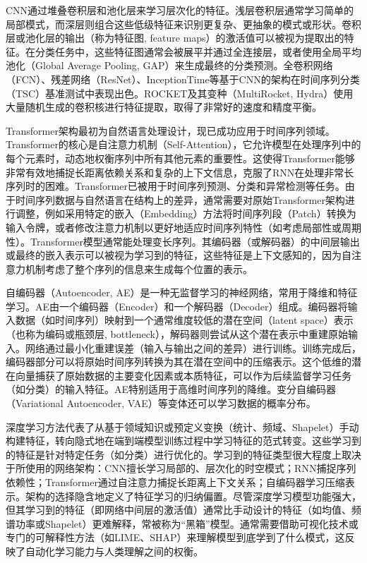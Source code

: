 CNN通过堆叠卷积层和池化层来学习层次化的特征。浅层卷积层通常学习简单的局部模式，而深层则组合这些低级特征来识别更复杂、更抽象的模式或形状。卷积层或池化层的输出（称为特征图, feature maps）的激活值可以被视为提取出的特征。在分类任务中，这些特征图通常会被展平并通过全连接层，或者使用全局平均池化（Global Average Pooling, GAP）来生成最终的分类预测。全卷积网络（FCN）、残差网络（ResNet）、InceptionTime等基于CNN的架构在时间序列分类（TSC）基准测试中表现出色。ROCKET及其变种（MultiRocket, Hydra）使用大量随机生成的卷积核进行特征提取，取得了非常好的速度和精度平衡。

Transformer架构最初为自然语言处理设计，现已成功应用于时间序列领域。Transformer的核心是自注意力机制（Self-Attention），它允许模型在处理序列中的每个元素时，动态地权衡序列中所有其他元素的重要性。这使得Transformer能够非常有效地捕捉长距离依赖关系和复杂的上下文信息，克服了RNN在处理非常长序列时的困难。Transformer已被用于时间序列预测、分类和异常检测等任务。由于时间序列数据与自然语言在结构上的差异，通常需要对原始Transformer架构进行调整，例如采用特定的嵌入（Embedding）方法将时间序列段（Patch）转换为输入令牌，或者修改注意力机制以更好地适应时间序列特性（如考虑局部性或周期性）。Transformer模型通常能处理变长序列。其编码器（或解码器）的中间层输出或最终的嵌入表示可以被视为学习到的特征，这些特征是上下文感知的，因为自注意力机制考虑了整个序列的信息来生成每个位置的表示。

自编码器（Autoencoder, AE）是一种无监督学习的神经网络，常用于降维和特征学习。AE由一个编码器（Encoder）和一个解码器（Decoder）组成。编码器将输入数据（如时间序列）映射到一个通常维度较低的潜在空间（latent space）表示（也称为编码或瓶颈层, bottleneck），解码器则尝试从这个潜在表示中重建原始输入。网络通过最小化重建误差（输入与输出之间的差异）进行训练。训练完成后，编码器部分可以将原始时间序列转换为其在潜在空间中的压缩表示。这个低维的潜在向量捕获了原始数据的主要变化因素或本质特征，可以作为后续监督学习任务（如分类）的输入特征。AE特别适用于高维时间序列的降维。变分自编码器（Variational Autoencoder, VAE）等变体还可以学习数据的概率分布。

深度学习方法代表了从基于领域知识或预定义变换（统计、频域、Shapelet）手动构建特征，转向隐式地在端到端模型训练过程中学习特征的范式转变。这些学习到的特征是针对特定任务（如分类）进行优化的。学习到的特征类型很大程度上取决于所使用的网络架构：CNN擅长学习局部的、层次化的时空模式；RNN捕捉序列依赖性；Transformer通过自注意力捕捉长距离上下文关系；自编码器学习压缩表示。架构的选择隐含地定义了特征学习的归纳偏置。尽管深度学习模型功能强大，但其学习到的特征（即网络中间层的激活值）通常比手动设计的特征（如均值、频谱功率或Shapelet）更难解释，常被称为“黑箱”模型。通常需要借助可视化技术或专门的可解释性方法（如LIME、SHAP）来理解模型到底学到了什么模式，这反映了自动化学习能力与人类理解之间的权衡。

